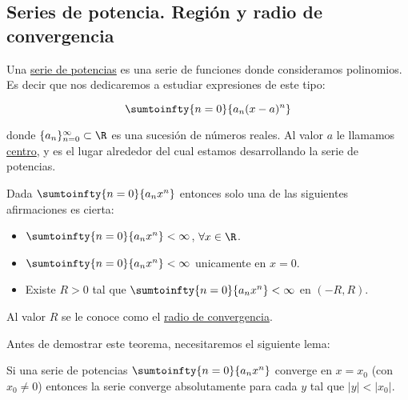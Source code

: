 \subsection{Series de potencia. Región y radio de convergencia}

\begin{defn}
    Una \ul{serie de potencias} es una serie de funciones donde consideramos polinomios. Es decir que nos dedicaremos a estudiar expresiones de este tipo:

    \[
    \sumtoinfty{n=0}{a_n(x-a)^n}
    \]
    
    \noindent donde $\{a_n\}_{n=0}^{\infty} \subset \R$ es una sucesión de números reales. Al valor $a$ le llamamos \ul{centro}, y es el lugar alrededor del cual estamos desarrollando la serie de potencias.
\end{defn}

\begin{teo}
    Dada $\sumtoinfty{n=0}{a_nx^n}$ entonces solo una de las siguientes afirmaciones es cierta:
    
    \begin{itemize}
        \item $\sumtoinfty{n=0}{a_nx^n} < \infty$, $\forall x \in \R$.
        \item $\sumtoinfty{n=0}{a_nx^n} < \infty$ unicamente en $x=0$.
        \item Existe $R > 0$ tal que $\sumtoinfty{n=0}{a_nx^n} < \infty$ en $(-R, R)$.
    \end{itemize}
    
    Al valor $R$ se le conoce como el \ul{radio de convergencia}.
\end{teo}

Antes de demostrar este teorema, necesitaremos el siguiente lema:

\begin{lem}\label{lem:pot1}
    Si una serie de potencias $\sumtoinfty{n=0}{a_nx^n}$ converge en $x = x_0$ (con $x_0 \neq 0$) entonces la serie converge absolutamente para cada $y$ tal que $|y| < |x_0|$.
\end{lem}

